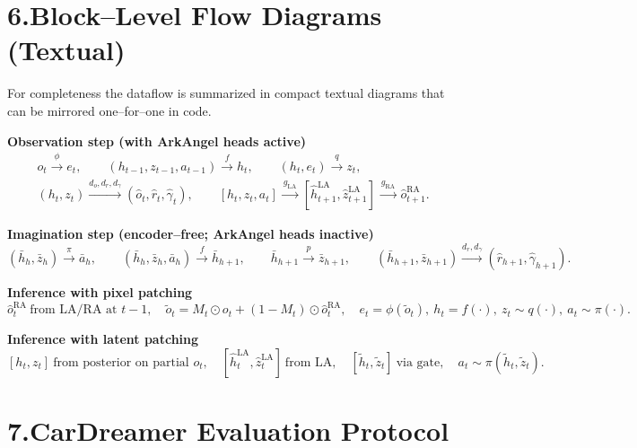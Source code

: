 \documentclass[11pt]{article}
\begin{document}
\section*{6.\quad Block--Level Flow Diagrams (Textual)}

For completeness the dataflow is summarized in compact textual diagrams that can be mirrored one--for--one in code.

\textbf{Observation step (with ArkAngel heads active)}
\[
\begin{array}{l}
o_t \xrightarrow{\ \phi\ } e_t, \qquad (h_{t-1},z_{t-1},a_{t-1}) \xrightarrow{\ f\ } h_t, \qquad (h_t,e_t) \xrightarrow{\ q\ } z_t, \\
(h_t,z_t) \xrightarrow{d_o,d_r,d_\gamma} (\hat o_t,\hat r_t,\hat\gamma_t), \qquad
[h_t,z_t,a_t] \xrightarrow{\ g_{\mathrm{LA}}\ } [\hat h_{t+1}^{\mathrm{LA}},\hat z_{t+1}^{\mathrm{LA}}]
\xrightarrow{\ g_{\mathrm{RA}}\ } \hat o_{t+1}^{\mathrm{RA}}.
\end{array}
\]

\textbf{Imagination step (encoder--free; ArkAngel heads inactive)}
\[
(\bar h_h,\bar z_h) \xrightarrow{\ \pi\ } \bar a_h,\qquad
(\bar h_h,\bar z_h,\bar a_h) \xrightarrow{\ f\ } \bar h_{h+1},\qquad
\bar h_{h+1} \xrightarrow{\ p\ } \bar z_{h+1},\qquad
(\bar h_{h+1},\bar z_{h+1}) \xrightarrow{d_r,d_\gamma} (\hat r_{h+1},\hat\gamma_{h+1}).
\]

\textbf{Inference with pixel patching}
\[
\hat o_{t}^{\mathrm{RA}} \ \text{from LA/RA at } t{-}1,\quad
\tilde o_t = M_t\odot o_t + (1-M_t)\odot \hat o_{t}^{\mathrm{RA}},\quad
e_t=\phi(\tilde o_t),\ h_t=f(\cdot),\ z_t\sim q(\cdot),\ a_t\sim \pi(\cdot).
\]

\textbf{Inference with latent patching}
\[
[h_t,z_t] \ \text{from posterior on partial } o_t,\quad
[\hat h_t^{\mathrm{LA}},\hat z_t^{\mathrm{LA}}] \ \text{from LA},\quad
[\tilde h_t,\tilde z_t] \ \text{via gate},\quad
a_t\sim\pi(\tilde h_t,\tilde z_t).
\]

\section*{7.\quad CarDreamer Evaluation Protocol}
\end{document}
